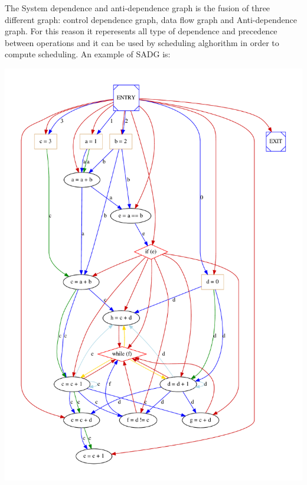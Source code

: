 The System dependence and anti-\/dependence graph is the fusion of three different graph\+: control dependence graph, data flow graph and Anti-\/dependence graph. For this reason it reperesents all type of dependence and precedence between operations and it can be used by scheduling alghorithm in order to compute scheduling. An example of S\+A\+DG is\+: 
\begin{DoxyImageNoCaption}
  \mbox{\includegraphics[width=\textwidth,height=\textheight/2,keepaspectratio=true]{dot_inline_dotgraph_7}}
\end{DoxyImageNoCaption}


